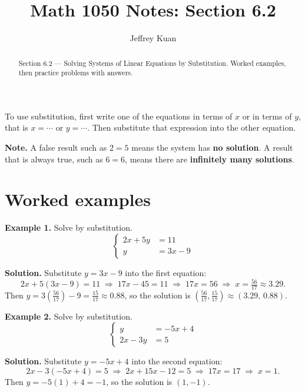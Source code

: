 \documentclass{ximera}
\author{Jeffrey Kuan}
\title{Math 1050 Notes: Section 6.2}
\begin{document}
\begin{abstract}
    Section 6.2 --- Solving Systems of Linear Equations by Substitution.
    Worked examples, then practice problems with answers.
\end{abstract}

\maketitle

To use substitution, first write one of the equations in terms of $x$ or in terms of
$y$, that is $x=\cdots$ or $y=\cdots$. Then substitute that expression into the other
equation.

\textbf{Note.} A false result such as $2=5$ means the system has \textbf{no solution}. A
result that is always true, such as $6=6$, means there are \textbf{infinitely many
solutions}.

\section*{Worked examples}

\begin{problem}

\textbf{Example 1.} Solve by substitution.
\[
  \left\{\begin{aligned}
    2x+5y &= 11 \\
    y &= 3x-9
  \end{aligned}\right.
\]

\begin{hint}
\textbf{Solution.} Substitute $y=3x-9$ into the first equation:
\[
  2x+5(3x-9)=11 \;\Longrightarrow\; 17x-45=11 \;\Longrightarrow\; 17x=56
  \;\Longrightarrow\; x=\tfrac{56}{17}\approx 3.29 .
\]
Then $y=3\left(\tfrac{56}{17}\right)-9=\tfrac{15}{17}\approx 0.88$, so the solution is
$\left(\tfrac{56}{17},\tfrac{15}{17}\right)\approx(3.29,\,0.88)$.
\end{hint}
\end{problem}

\begin{problem}

\textbf{Example 2.} Solve by substitution.
\[
  \left\{\begin{aligned}
    y &= -5x+4 \\
    2x-3y &= 5
  \end{aligned}\right.
\]

\begin{hint}
\textbf{Solution.} Substitute $y=-5x+4$ into the second equation:
\[
  2x-3(-5x+4)=5 \;\Longrightarrow\; 2x+15x-12=5 \;\Longrightarrow\; 17x=17
  \;\Longrightarrow\; x=1 .
\]
Then $y=-5(1)+4=-1$, so the solution is $(1,-1)$.
\end{hint}
\end{problem}
\end{document}
